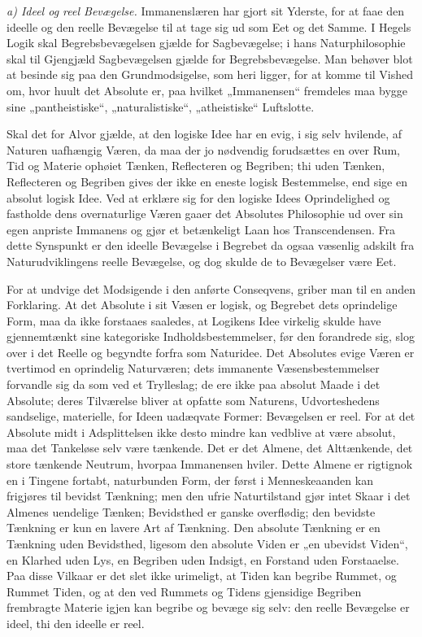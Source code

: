 \documentclass[12pt,a4paper]{book}
\newcommand{\runin}[1]{\emph{#1}\hspace{0.4em}}
\begin{document}
\runin{a) Ideel og reel Bevægelse.} Immanenslæren har gjort sit
Yderste, for at faae den ideelle og den reelle Bevægelse til at tage
sig ud som Eet og det Samme. I Hegels Logik skal Begrebsbevægelsen
gjælde for Sagbevægelse; i hans Naturphilosophie skal til Gjengjæld
Sagbevægelsen gjælde for Begrebsbevægelse. Man behøver blot at besinde
sig paa den Grundmodsigelse, som heri ligger, for at komme til Vished
om, hvor huult det Absolute er, paa hvilket „Immanensen“ fremdeles maa
bygge sine „pantheistiske“, „naturalistiske“, „atheistiske“ Luftslotte.

Skal det for Alvor gjælde, at den logiske Idee har en evig, i sig selv
hvilende, af Naturen uafhængig Væren, da maa der jo nødvendig
forudsættes en over Rum, Tid og
Materie ophøiet Tænken, Reflecteren og Begriben; thi uden Tænken,
Reflecteren og Begriben gives der ikke en eneste logisk Bestemmelse,
end sige en absolut logisk Idee. Ved at erklære sig for den logiske
Idees Oprindelighed og fastholde dens overnaturlige Væren gaaer det
Absolutes Philosophie ud over sin egen anpriste Immanens og gjør et
betænkeligt Laan hos Transcendensen. Fra dette Synspunkt er den ideelle
Bevægelse i Begrebet da ogsaa væsenlig adskilt fra Naturudviklingens
reelle Bevægelse, og dog skulde de to Bevægelser være Eet.

For at undvige det Modsigende i den anførte Conseqvens, griber man til
en anden Forklaring. At det Absolute i sit Væsen er logisk, og Begrebet
dets oprindelige Form, maa da ikke forstaaes saaledes, at Logikens Idee
virkelig skulde have gjennemtænkt sine kategoriske
Indholdsbestemmelser, før den forandrede sig, slog over i det Reelle og
begyndte forfra som Naturidee. Det Absolutes evige Væren er tvertimod
en oprindelig Naturværen; dets immanente Væsensbestemmelser forvandle
sig da som ved et Trylleslag; de ere ikke paa absolut Maade i det
Absolute; deres Tilværelse bliver at opfatte som Naturens,
Udvorteshedens sandselige, materielle, for Ideen uadæqvate Former:
Bevægelsen er reel. For at det Absolute midt i Adsplittelsen ikke desto
mindre kan vedblive at være absolut, maa det Tankeløse selv være
tænkende. Det er det Almene, det Alttænkende, det store tænkende
Neutrum, hvorpaa Immanensen hviler. Dette Almene er rigtignok en i
Tingene fortabt, naturbunden Form, der først i Menneskeaanden kan
frigjøres til bevidst Tænkning; men den ufrie Naturtilstand gjør intet
Skaar i det Almenes uendelige Tænken; Bevidsthed er ganske overflødig;
den bevidste Tænkning er kun en lavere Art af Tænkning. Den absolute
Tænkning er en Tænkning uden Bevidsthed, ligesom den absolute Viden er
„en ubevidst Viden“, en Klarhed uden Lys, en Begriben uden Indsigt,
en Forstand uden Forstaaelse. Paa disse Vilkaar er det slet ikke
urimeligt, at Tiden kan begribe Rummet, og Rummet Tiden, og at den ved
Rummets og Tidens gjensidige Begriben frembragte Materie igjen kan
begribe og bevæge sig selv: den reelle Bevægelse er ideel, thi den
ideelle er reel.
\end{document}
